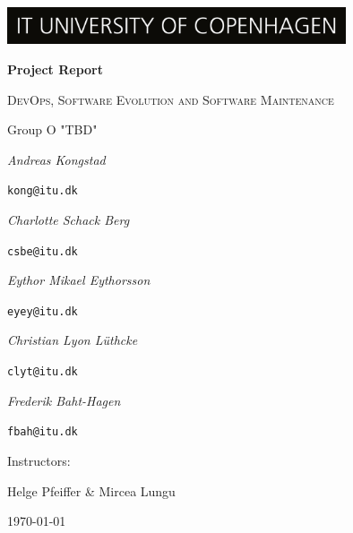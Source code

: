 \documentclass{scrartcl}
\begin{document}
\begin{titlepage}
    \centering
    \includegraphics[width=10cm]{images/ITU_logo_UK jpg.jpg}
    \vspace{1.5cm}
    
	{\huge\bfseries Project Report\par}
	\vspace{1cm}
    {\scshape\Large DevOps, Software Evolution and Software Maintenance \par}
	\vspace{2cm}
	{\Large Group O "TBD"}\par
	\vspace{0.5cm}
	{\Large\itshape Andreas Kongstad}\par
	\texttt{kong@itu.dk}\par
	\vspace{0.5cm}
	{\Large\itshape Charlotte Schack Berg}\par
	\texttt{csbe@itu.dk}\par
	\vspace{0.5cm}
	{\Large\itshape Eythor Mikael Eythorsson}\par
	\texttt{eyey@itu.dk}\par
	\vspace{0.5cm}
	{\Large\itshape Christian Lyon Lüthcke}\par
	\texttt{clyt@itu.dk}\par
	\vspace{0.5cm}
	{\Large\itshape Frederik Baht-Hagen}\par
	\texttt{fbah@itu.dk}\par
	\vfill
	Instructors:\par
    Helge Pfeiffer \& Mircea Lungu

	\vspace{1cm}

	{\large \today\par}
\end{titlepage}

\newpage
\tableofcontents

\clearpage



\clearpage

\clearpage

\clearpage

\printbibliography
\clearpage
\appendix

\end{document}
